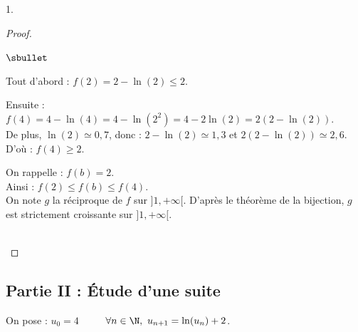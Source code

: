 \documentclass[11pt]{article}%
\begin{document}
\begin{noliste}{1.}
  \begin{proof}~
    \begin{noliste}{$\sbullet$}
      \item Tout d'abord : $f(2) = 2-\ln(2) \leq 2$.
      \item Ensuite : $f(4) = 4-\ln(4) = 4 - \ln(2^2) = 4 -2\ln(2) =
      2(2-\ln(2))$.\\
      De plus, $\ln(2) \simeq 0,7$, donc : $2-\ln(2) \simeq 1,3$
      et $2(2-\ln(2)) \simeq 2,6$.\\
      D'où : $f(4) \geq 2$.
      
      \item On rappelle : $f(b)=2$.\\
      Ainsi : $f(2) \leq f(b) \leq f(4)$.\\
      On note $g$ la réciproque de $f$ sur $]1,+\infty[$. D'après le 
      théorème de la bijection, $g$ est strictement croissante sur 
      $]1,+\infty[$.
    \end{noliste}
    
    ~\\[-1.4cm]
  \end{proof}
\end{noliste}




\subsection*{Partie II : Étude d'une suite}

\noindent
On pose : $u_0=4$ \ \  \ \ $\forall n \in \N, \ u_{n+1} =
\ln(u_n) +2$.
\end{document}
